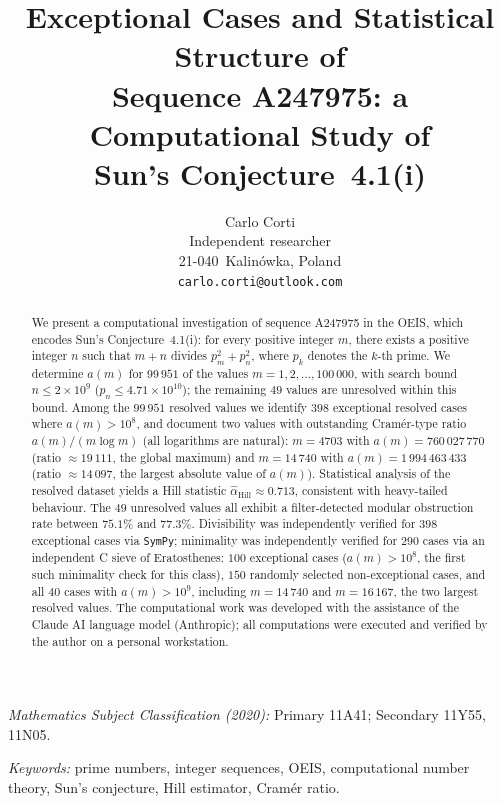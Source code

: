 \documentclass[12pt]{article}
\title{Exceptional Cases and Statistical Structure of\\
	Sequence A247975: a Computational Study of\\
	Sun's Conjecture~4.1(i)}
\author{Carlo Corti\\[4pt]
	\small Independent researcher\\
	\small 21-040~Kalin\'owka, Poland\\
	\small \texttt{carlo.corti@outlook.com}}
\date{}
\begin{document}
	
	\maketitle
	
	\noindent
	\textit{Mathematics Subject Classification (2020):}
	Primary 11A41; Secondary 11Y55, 11N05.
	
	\noindent
	\textit{Keywords:}
	prime numbers, integer sequences, OEIS, computational number theory,
	Sun's conjecture, Hill estimator, Cram\'er ratio.
	
	\begin{abstract}
		We present a computational investigation of sequence A247975 in the
		OEIS, which encodes Sun's Conjecture~4.1(i): for every positive integer
		$m$, there exists a positive integer $n$ such that $m+n$ divides
		$p_m^2 + p_n^2$, where $p_k$ denotes the $k$-th prime.
		We determine $a(m)$ for $99\,951$ of the values $m = 1, 2, \ldots,
		100\,000$, with search bound $n \leq 2 \times 10^9$
		($p_n \leq 4.71 \times 10^{10}$); the remaining $49$ values are
		unresolved within this bound.
		Among the $99\,951$ resolved values we identify $398$ exceptional
		resolved cases where $a(m) > 10^8$, and document two values with
		outstanding Cram\'er-type ratio $a(m)/(m \log m)$
		(all logarithms are natural): $m = 4703$ with
		$a(m) = 760\,027\,770$ (ratio $\approx 19\,111$, the global maximum)
		and $m = 14\,740$
		with $a(m) = 1\,994\,463\,433$ (ratio $\approx 14\,097$, the largest
		absolute value of $a(m)$).
		Statistical analysis of the resolved dataset yields a Hill statistic
		$\hat{\alpha}_{\mathrm{Hill}} \approx 0.713$, consistent with
		heavy-tailed behaviour.
		The $49$ unresolved values all exhibit a filter-detected modular
		obstruction rate between $75.1\%$ and $77.3\%$.
		Divisibility was independently verified for $398$ exceptional cases via
		\texttt{SymPy}; minimality was independently verified for $290$ cases
		via an independent C sieve of Eratosthenes: $100$ exceptional cases
		($a(m) > 10^8$, the first such minimality check for this class),
		$150$ randomly selected non-exceptional cases, and all $40$ cases with
		$a(m) > 10^9$, including $m = 14\,740$ and $m = 16\,167$, the two largest
		resolved values.
		The computational work was developed with the assistance of the Claude
		AI language model (Anthropic); all computations were executed and
		verified by the author on a personal workstation.
	\end{abstract}
	
\end{document}
